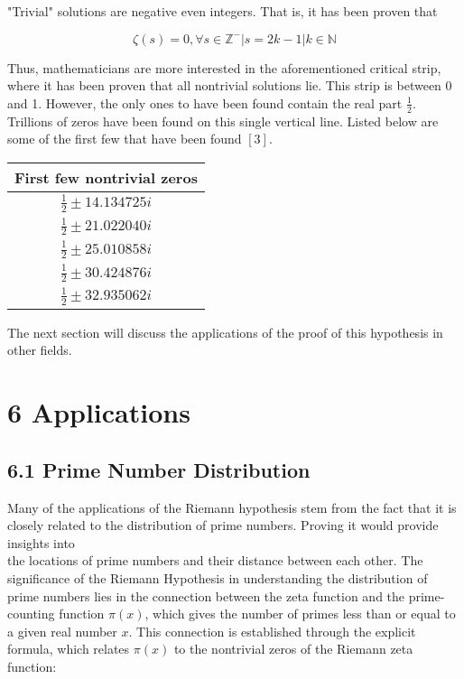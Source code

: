 \documentclass[10pt]{article}
\begin{document}
"Trivial" solutions are negative even integers. That is, it has been proven that

$$
\zeta(s)=0, \forall s \in \mathbb{Z}^{-}|s=2 k-1| k \in \mathbb{N}
$$

Thus, mathematicians are more interested in the aforementioned critical strip, where it has been proven that all nontrivial solutions lie. This strip is between 0 and 1. However, the only ones to have been found contain the real part $\frac{1}{2}$. Trillions of zeros have been found on this single vertical line. Listed below are some of the first few that have been found $[3]$.

\begin{center}
\begin{tabular}{||c||}
\hline
First few nontrivial zeros \\
\hline\hline
$\frac{1}{2} \pm 14.134725 i$ \\
\hline
$\frac{1}{2} \pm 21.022040 i$ \\
\hline
$\frac{1}{2} \pm 25.010858 i$ \\
\hline
$\frac{1}{2} \pm 30.424876 i$ \\
\hline
$\frac{1}{2} \pm 32.935062 i$ \\
\hline
\end{tabular}
\end{center}

The next section will discuss the applications of the proof of this hypothesis in other fields.

\section*{6 Applications}
\subsection*{6.1 Prime Number Distribution}
Many of the applications of the Riemann hypothesis stem from the fact that it is closely related to the distribution of prime numbers. Proving it would provide insights into\\
the locations of prime numbers and their distance between each other. The significance of the Riemann Hypothesis in understanding the distribution of prime numbers lies in the connection between the zeta function and the prime-counting function $\pi(x)$, which gives the number of primes less than or equal to a given real number $x$. This connection is established through the explicit formula, which relates $\pi(x)$ to the nontrivial zeros of the Riemann zeta function:
\end{document}
